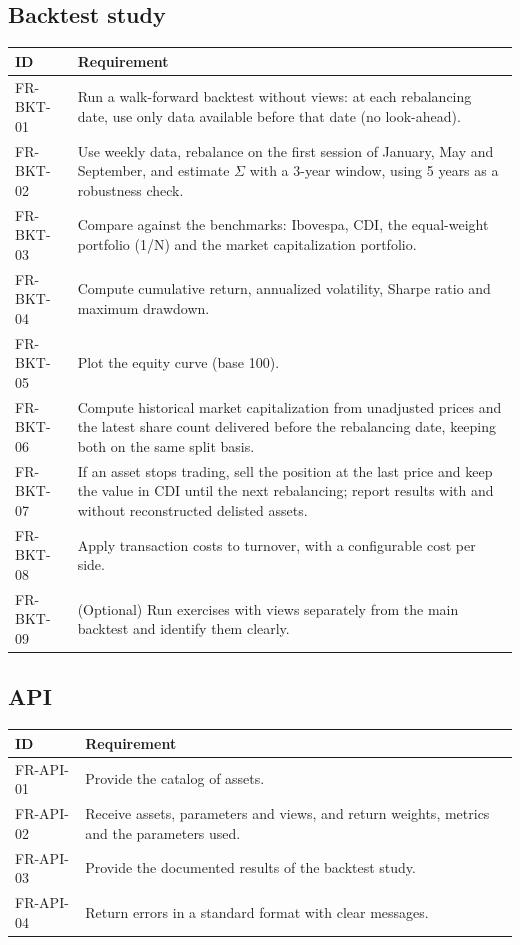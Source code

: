 \subsection{Backtest study}
\begin{tabularx}{\textwidth}{@{}lX@{}}
\toprule
\textbf{ID} & \textbf{Requirement} \\ \midrule
FR-BKT-01 & Run a walk-forward backtest without views: at each rebalancing date, use only data available before that date (no look-ahead). \\
FR-BKT-02 & Use weekly data, rebalance on the first session of January, May and September, and estimate $\Sigma$ with a 3-year window, using 5 years as a robustness check. \\
FR-BKT-03 & Compare against the benchmarks: Ibovespa, CDI, the equal-weight portfolio (1/N) and the market capitalization portfolio. \\
FR-BKT-04 & Compute cumulative return, annualized volatility, Sharpe ratio and maximum drawdown. \\
FR-BKT-05 & Plot the equity curve (base 100). \\
FR-BKT-06 & Compute historical market capitalization from unadjusted prices and the latest share count delivered before the rebalancing date, keeping both on the same split basis. \\
FR-BKT-07 & If an asset stops trading, sell the position at the last price and keep the value in CDI until the next rebalancing; report results with and without reconstructed delisted assets. \\
FR-BKT-08 & Apply transaction costs to turnover, with a configurable cost per side. \\
FR-BKT-09 & (Optional) Run exercises with views separately from the main backtest and identify them clearly. \\
\bottomrule
\end{tabularx}

\subsection{API}
\begin{tabularx}{\textwidth}{@{}lX@{}}
\toprule
\textbf{ID} & \textbf{Requirement} \\ \midrule
FR-API-01 & Provide the catalog of assets. \\
FR-API-02 & Receive assets, parameters and views, and return weights, metrics and the parameters used. \\
FR-API-03 & Provide the documented results of the backtest study. \\
FR-API-04 & Return errors in a standard format with clear messages. \\
\bottomrule
\end{tabularx}

